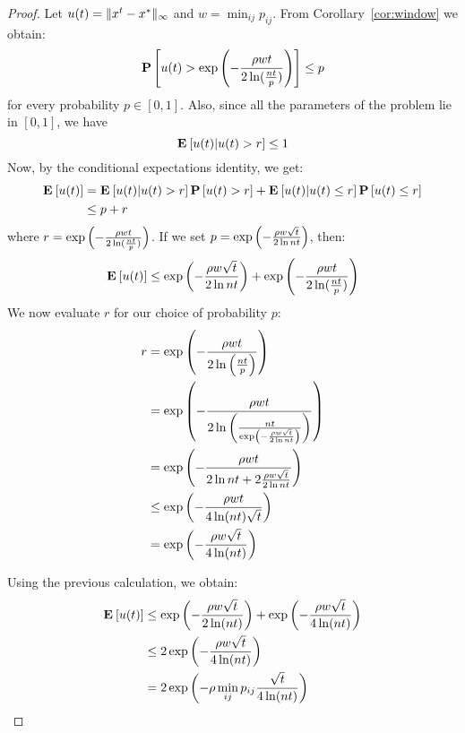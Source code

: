 \begin{proof}
Let $u(t) = \| x^t-x^* \|_{\infty}$ and $w = \min_{ij}p_{ij}$.
From Corollary~\ref{cor:window} we obtain:
$$ \bm{\mathrm{P}}\left[u(t) >\exp\left(-\frac{\rho wt}{2\ln( \frac{nt}{p})} \right)\right] \leq p $$
for every probability $p \in [0,1]$. Also, since all the 
parameters of the problem lie in $[0,1]$, we have
$$\Exp{u(t)|u(t) > r} \leq 1$$
Now, by the conditional expectations identity, we get:
\begin{align*}
\Exp{u(t)} &= \Exp{u(t)|u(t) > r}\Prob{u(t) > r} +\Exp{u(t)|u(t) \leq r}\Prob{u(t) \leq r}\\
&\leq p + r
\end{align*}
where $r = \exp \left(-\frac{\rho wt}{2\ln( \frac{nt}{p})}\right)$. 
If we set $p = \exp \left(-\frac{\rho w\sqrt{t}}{2\ln nt}\right)$, then:
$$
\Exp{u(t)} \leq \exp \lp(-\frac{\rho w\sqrt{t}}{2\ln nt}\rp) 
+ \exp \lp(-\frac{\rho wt}{2\ln( \frac{nt}{p})}\rp)
$$
We now evaluate $r$ for our choice of probability $p$:
\begin{align*}
r
&= \exp \left(-\frac{\rho wt}{2\ln\left( \frac{nt}{p}\right)} \right)\\
&= \exp \left(-\frac{\rho wt}{2\ln\left( \frac{nt}{\exp \left(-\frac{\rho w\sqrt{t}}{2\ln nt}\right) }\right) } \right) \\
&= \exp \left(-\frac{\rho wt}{2\ln nt + 2\frac{\rho w\sqrt{t}}{2\ln nt} }\right)\\
&\leq \exp \left(-\frac{\rho w t}{4\ln(nt) \sqrt{t}}\right)\\
&= \exp \left(-\frac{\rho w\sqrt{t}}{4\ln(nt)}\right)
\end{align*}

Using the previous calculation, we obtain:
\begin{align*}
\Exp{u(t)} &\leq \exp \lp(-\frac{\rho w\sqrt{t}}{2\ln (nt)}\rp) + 
\exp \lp(-\frac{\rho w\sqrt{t}}{4\ln(nt)}\rp) \\
&\leq 2\exp \lp(-\frac{\rho w\sqrt{t}}{4\ln(nt)}\rp)\\
&=
    2\exp \lp(- \rho  \min_{ij} p_{ij} \frac{\sqrt{t}}{4\ln(nt)} \rp)
\end{align*}
\end{proof}




